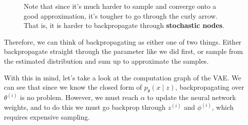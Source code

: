 \begin{example}[Softmax]
\begin{figure}[H]
      \caption{Note that since it's much harder to sample and converge onto a good approximation, it's tougher to go through the curly arrow. That is, it is harder to backpropagate through \textbf{stochastic nodes}. }
      \label{fig:softmax2}
    \end{figure}

    Therefore, we can think of backpropagating as either one of two things. Either backpropagate straight through the parameter like we did first, or sample from the estimated distribution and sum up to approximate the samples. 
  \end{example}

  With this in mind, let's take a look at the computation graph of the VAE. We can see that since we know the closed form of $p_\theta (x \mid z)$, backpropagating over $\theta^{(i)}$ is no problem. However, we must reach $\alpha$ to update the neural network weights, and to do this we must go backprop through $z^{(i)}$ and $\phi^{(i)}$, which requires expensive sampling. 

